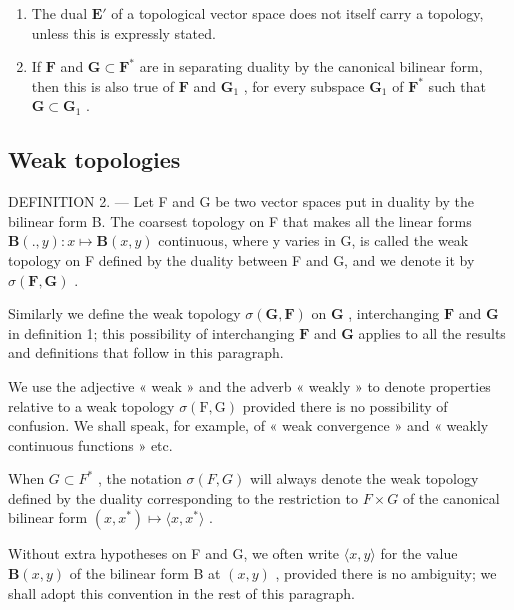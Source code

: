 \begin{enumerate}
\def\labelenumi{\arabic{enumi})}
\setcounter{enumi}{1}
\item
  The dual \(\mathbf{E}'\) of a topological vector space does not itself carry a topology, unless this is expressly stated.
\item
  If \(\mathbf{F}\) and \(\mathbf{G} \subset \mathbf{F}^*\) are in separating duality by the canonical bilinear form, then this is also true of \(\mathbf{F}\) and \(\mathbf{G}_1\) , for every subspace \(\mathbf{G}_1\) of \(\mathbf{F}^*\) such that \(\mathbf{G} \subset \mathbf{G}_1\) .
\end{enumerate}

\subsection{Weak topologies}

DEFINITION 2. --- Let F and G be two vector spaces put in duality by the bilinear form B. The coarsest topology on F that makes all the linear forms \(\mathbf{B}(., y): x \mapsto \mathbf{B}(x, y)\) continuous, where y varies in G, is called the weak topology on F defined by the duality between F and G, and we denote it by \(\sigma(\mathbf{F}, \mathbf{G})\) .

Similarly we define the weak topology \(\sigma(\mathbf{G},\mathbf{F})\) on \(\mathbf{G}\) , interchanging \(\mathbf{F}\) and \(\mathbf{G}\) in definition 1; this possibility of interchanging \(\mathbf{F}\) and \(\mathbf{G}\) applies to all the results and definitions that follow in this paragraph.

We use the adjective « weak » and the adverb « weakly » to denote properties relative to a weak topology \(\sigma(\mathrm{F},\mathrm{G})\) provided there is no possibility of confusion. We shall speak, for example, of « weak convergence » and « weakly continuous functions » etc.

When \(G \subset F^{*}\) , the notation \(\sigma(F, G)\) will always denote the weak topology defined by the duality corresponding to the restriction to \(F \times G\) of the canonical bilinear form \((x, x^{*}) \mapsto \langle x, x^{*} \rangle\) .

Without extra hypotheses on F and G, we often write \(\langle x, y \rangle\) for the value \(\mathbf{B}(x, y)\) of the bilinear form B at \((x, y)\) , provided there is no ambiguity; we shall adopt this convention in the rest of this paragraph.

